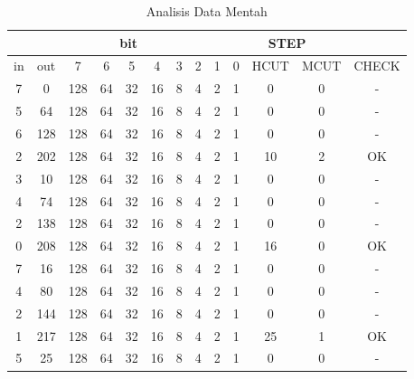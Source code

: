 \begin{table}[H]
	\centering
	\caption{Analisis Data Mentah}
	\label{tab:translasi}%
	\begin{tabular}{|c|c|c|c|c|c|c|c|c|c|c|c|c|}
		\hline
		\rowcolor[rgb]{ .949,  .949,  .949} \multicolumn{2}{|c|}{IO} & \multicolumn{8}{c|}{bit}                                      & \multicolumn{3}{c|}{STEP} \bigstrut\\
		\hline
		\rowcolor[rgb]{ .949,  .949,  .949} in    & out   & 7     & 6     & 5     & 4     & 3     & 2     & 1     & 0     & HCUT  & MCUT  & \multicolumn{1}{l|}{CHECK} \bigstrut\\
		\hline
		7     & 0     & 128   & 64    & 32    & 16    & 8     & 4     & 2     & 1     & 0     & 0     & - \bigstrut\\
		\hline
		5     & 64    & 128   & 64    & 32    & 16    & 8     & 4     & 2     & 1     & 0     & 0     & - \bigstrut\\
		\hline
		6     & 128   & 128   & 64    & 32    & 16    & 8     & 4     & 2     & 1     & 0     & 0     & - \bigstrut\\
		\hline
		2     & 202   & 128   & 64    & 32    & 16    & 8     & 4     & 2     & 1     & 10    & 2     & OK \bigstrut\\
		\hline
		3     & 10    & 128   & 64    & 32    & 16    & 8     & 4     & 2     & 1     & 0     & 0     & - \bigstrut\\
		\hline
		4     & 74    & 128   & 64    & 32    & 16    & 8     & 4     & 2     & 1     & 0     & 0     & - \bigstrut\\
		\hline
		2     & 138   & 128   & 64    & 32    & 16    & 8     & 4     & 2     & 1     & 0     & 0     & - \bigstrut\\
		\hline
		0     & 208   & 128   & 64    & 32    & 16    & 8     & 4     & 2     & 1     & 16    & 0     & OK \bigstrut\\
		\hline
		7     & 16    & 128   & 64    & 32    & 16    & 8     & 4     & 2     & 1     & 0     & 0     & - \bigstrut\\
		\hline
		4     & 80    & 128   & 64    & 32    & 16    & 8     & 4     & 2     & 1     & 0     & 0     & - \bigstrut\\
		\hline
		2     & 144   & 128   & 64    & 32    & 16    & 8     & 4     & 2     & 1     & 0     & 0     & - \bigstrut\\
		\hline
		1     & 217   & 128   & 64    & 32    & 16    & 8     & 4     & 2     & 1     & 25    & 1     & OK \bigstrut\\
		\hline
		5     & 25    & 128   & 64    & 32    & 16    & 8     & 4     & 2     & 1     & 0     & 0     & - \bigstrut\\

\end{tabular}
\end{table}
